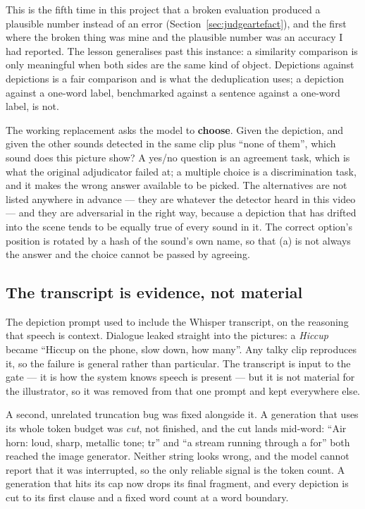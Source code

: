 \documentclass[11pt,a4paper]{article}
\begin{document}
This is the fifth time in this project that a broken evaluation produced a plausible number instead
of an error (Section~\ref{sec:judgeartefact}), and the first where the broken thing was mine and the
plausible number was an accuracy I had reported. The lesson generalises past this instance: a
similarity comparison is only meaningful when both sides are the same kind of object. Depictions
against depictions is a fair comparison and is what the deduplication uses; a depiction against a
one-word label, benchmarked against a sentence against a one-word label, is not.

The working replacement asks the model to \textbf{choose}. Given the depiction, and given the other
sounds detected in the same clip plus ``none of them'', which sound does this picture show? A yes/no
question is an agreement task, which is what the original adjudicator failed at; a multiple choice is
a discrimination task, and it makes the wrong answer available to be picked. The alternatives are not
listed anywhere in advance --- they are whatever the detector heard in this video --- and they are
adversarial in the right way, because a depiction that has drifted into the scene tends to be equally
true of every sound in it. The correct option's position is rotated by a hash of the sound's own
name, so that (a) is not always the answer and the choice cannot be passed by agreeing.

\subsection{The transcript is evidence, not material}\label{sec:notranscript}
The depiction prompt used to include the Whisper transcript, on the reasoning that speech is context.
Dialogue leaked straight into the pictures: a \emph{Hiccup} became ``Hiccup on the phone, slow down,
how many''. Any talky clip reproduces it, so the failure is general rather than particular. The
transcript is input to the gate --- it is how the system knows speech is present --- but it is not
material for the illustrator, so it was removed from that one prompt and kept everywhere else.

A second, unrelated truncation bug was fixed alongside it. A generation that uses its whole token
budget was \emph{cut}, not finished, and the cut lands mid-word: ``Air horn: loud, sharp, metallic
tone; tr'' and ``a stream running through a for'' both reached the image generator. Neither string
looks wrong, and the model cannot report that it was interrupted, so the only reliable signal is the
token count. A generation that hits its cap now drops its final fragment, and every depiction is cut
to its first clause and a fixed word count at a word boundary.
\end{document}
